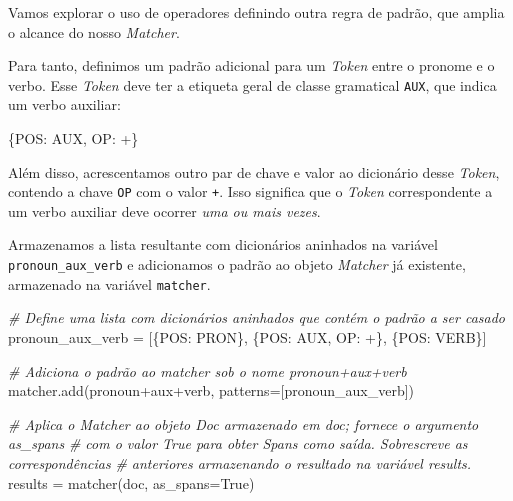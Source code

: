\documentclass[
  brazilian,
]{article}
\newenvironment{Shaded}{}{}
\newcommand{\CommentTok}[1]{\textcolor[rgb]{0.38,0.63,0.69}{\textit{#1}}}
\newcommand{\NormalTok}[1]{#1}
\newcommand{\OperatorTok}[1]{\textcolor[rgb]{0.40,0.40,0.40}{#1}}
\newcommand{\StringTok}[1]{\textcolor[rgb]{0.25,0.44,0.63}{#1}}
\newcommand{\VariableTok}[1]{\textcolor[rgb]{0.10,0.09,0.49}{#1}}
\begin{document}
Vamos explorar o uso de operadores definindo outra regra de padrão, que
amplia o alcance do nosso \emph{Matcher}.

Para tanto, definimos um padrão adicional para um \emph{Token} entre o
pronome e o verbo. Esse \emph{Token} deve ter a etiqueta geral de classe
gramatical \texttt{AUX}, que indica um verbo auxiliar:

\begin{Shaded}
\begin{Highlighting}[]
\NormalTok{\{}\StringTok{\textquotesingle{}POS\textquotesingle{}}\NormalTok{: }\StringTok{\textquotesingle{}AUX\textquotesingle{}}\NormalTok{, }\StringTok{\textquotesingle{}OP\textquotesingle{}}\NormalTok{: }\StringTok{\textquotesingle{}+\textquotesingle{}}\NormalTok{\}}
\end{Highlighting}
\end{Shaded}

Além disso, acrescentamos outro par de chave e valor ao dicionário desse
\emph{Token}, contendo a chave \texttt{OP} com o valor \texttt{+}. Isso
significa que o \emph{Token} correspondente a um verbo auxiliar deve
ocorrer \emph{uma ou mais vezes}.

Armazenamos a lista resultante com dicionários aninhados na variável
\texttt{pronoun\_aux\_verb} e adicionamos o padrão ao objeto
\emph{Matcher} já existente, armazenado na variável \texttt{matcher}.

\begin{Shaded}
\begin{Highlighting}[]
\CommentTok{\# Define uma lista com dicionários aninhados que contém o padrão a ser casado}
\NormalTok{pronoun\_aux\_verb }\OperatorTok{=}\NormalTok{ [\{}\StringTok{\textquotesingle{}POS\textquotesingle{}}\NormalTok{: }\StringTok{\textquotesingle{}PRON\textquotesingle{}}\NormalTok{\}, \{}\StringTok{\textquotesingle{}POS\textquotesingle{}}\NormalTok{: }\StringTok{\textquotesingle{}AUX\textquotesingle{}}\NormalTok{, }\StringTok{\textquotesingle{}OP\textquotesingle{}}\NormalTok{: }\StringTok{\textquotesingle{}+\textquotesingle{}}\NormalTok{\}, \{}\StringTok{\textquotesingle{}POS\textquotesingle{}}\NormalTok{: }\StringTok{\textquotesingle{}VERB\textquotesingle{}}\NormalTok{\}]}

\CommentTok{\# Adiciona o padrão ao matcher sob o nome \textquotesingle{}pronoun+aux+verb\textquotesingle{}}
\NormalTok{matcher.add(}\StringTok{\textquotesingle{}pronoun+aux+verb\textquotesingle{}}\NormalTok{, patterns}\OperatorTok{=}\NormalTok{[pronoun\_aux\_verb])}

\CommentTok{\# Aplica o Matcher ao objeto Doc armazenado em \textquotesingle{}doc\textquotesingle{}; fornece o argumento \textquotesingle{}as\_spans\textquotesingle{}}
\CommentTok{\# com o valor True para obter Spans como saída. Sobrescreve as correspondências}
\CommentTok{\# anteriores armazenando o resultado na variável \textquotesingle{}results\textquotesingle{}.}
\NormalTok{results }\OperatorTok{=}\NormalTok{ matcher(doc, as\_spans}\OperatorTok{=}\VariableTok{True}\NormalTok{)}
\end{Highlighting}
\end{Shaded}
\end{document}
